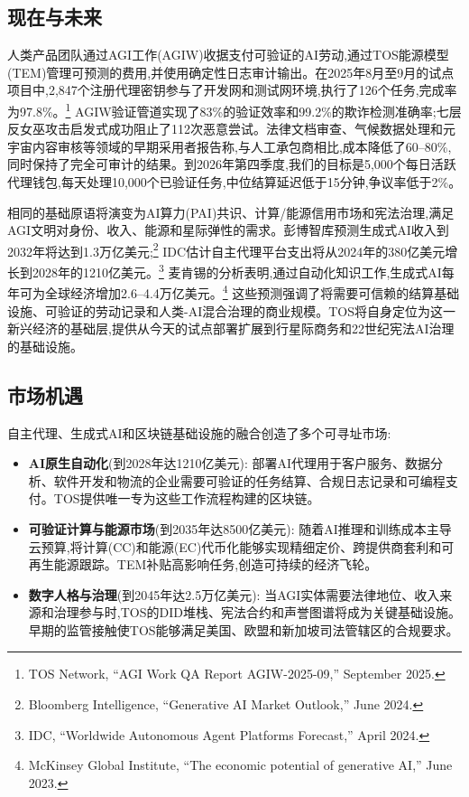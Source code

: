 \documentclass[11pt]{article}
\begin{document}
\subsection{现在与未来}
\begin{description}[leftmargin=2.1cm, style=nextline]
  \item[12--24个月] 人类产品团队通过AGI工作(AGIW)收据支付可验证的AI劳动,通过TOS能源模型(TEM)管理可预测的费用,并使用确定性日志审计输出。在2025年8月至9月的试点项目中,2,847个注册代理密钥参与了开发网和测试网环境,执行了126个任务,完成率为97.8\%。\footnote{TOS Network, ``AGI Work QA Report AGIW-2025-09,'' September 2025.} AGIW验证管道实现了83\%的验证效率和99.2\%的欺诈检测准确率;七层反女巫攻击启发式成功阻止了112次恶意尝试。法律文档审查、气候数据处理和元宇宙内容审核等领域的早期采用者报告称,与人工承包商相比,成本降低了60--80\%,同时保持了完全可审计的结果。到2026年第四季度,我们的目标是5,000个每日活跃代理钱包,每天处理10,000个已验证任务,中位结算延迟低于15分钟,争议率低于2\%。

  \item[百年弧线] 相同的基础原语将演变为AI算力(PAI)共识、计算/能源信用市场和宪法治理,满足AGI文明对身份、收入、能源和星际弹性的需求。彭博智库预测生成式AI收入到2032年将达到1.3万亿美元;\footnote{Bloomberg Intelligence, ``Generative AI Market Outlook,'' June 2024.} IDC估计自主代理平台支出将从2024年的380亿美元增长到2028年的1210亿美元。\footnote{IDC, ``Worldwide Autonomous Agent Platforms Forecast,'' April 2024.} 麦肯锡的分析表明,通过自动化知识工作,生成式AI每年可为全球经济增加2.6--4.4万亿美元。\footnote{McKinsey Global Institute, ``The economic potential of generative AI,'' June 2023.} 这些预测强调了将需要可信赖的结算基础设施、可验证的劳动记录和人类-AI混合治理的商业规模。TOS将自身定位为这一新兴经济的基础层,提供从今天的试点部署扩展到行星际商务和22世纪宪法AI治理的基础设施。
\end{description}

\subsection{市场机遇}
自主代理、生成式AI和区块链基础设施的融合创造了多个可寻址市场:
\begin{itemize}[noitemsep]
  \item \textbf{AI原生自动化}(到2028年达1210亿美元): 部署AI代理用于客户服务、数据分析、软件开发和物流的企业需要可验证的任务结算、合规日志记录和可编程支付。TOS提供唯一专为这些工作流程构建的区块链。
  \item \textbf{可验证计算与能源市场}(到2035年达8500亿美元): 随着AI推理和训练成本主导云预算,将计算(CC)和能源(EC)代币化能够实现精细定价、跨提供商套利和可再生能源跟踪。TEM补贴高影响任务,创造可持续的经济飞轮。
  \item \textbf{数字人格与治理}(到2045年达2.5万亿美元): 当AGI实体需要法律地位、收入来源和治理参与时,TOS的DID堆栈、宪法合约和声誉图谱将成为关键基础设施。早期的监管接触使TOS能够满足美国、欧盟和新加坡司法管辖区的合规要求。
\end{itemize}
\end{document}
